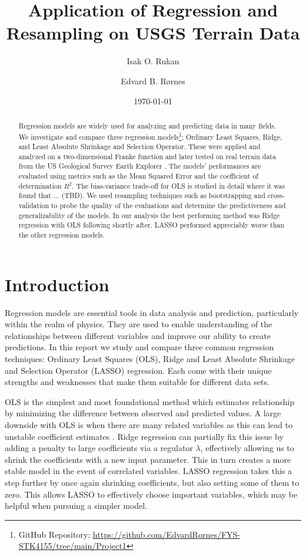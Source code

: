\documentclass[%
reprint,
amsmath,amssymb,
aps,
pra,
]{revtex4-2}
\begin{document}
	
\title{Application of Regression and Resampling on USGS Terrain Data}
\author{Isak O. Rukan}
\author{Edvard B. Rørnes}
\date{\today}

\begin{abstract}
	Regression models are widely used for analyzing and predicting data in many fields. We investigate and compare three regression models\footnote{GitHub Repository: \url{https://github.com/EdvardRornes/FYS-STK4155/tree/main/Project1}}: Ordinary Least Squares, Ridge, and Least Absolute Shrinkage and Selection Operator. These were applied and analyzed on a two-dimensional Franke function and later tested on real terrain data from the US Geological Survey Earth Explorer \cite{USGS_EarthExplorer}. The models' performances are evaluated using metrics such as the Mean Squared Error and the coefficient of determination $R^2$. The bias-variance trade-off for OLS is studied in detail where it was found that ... (TBD). We used resampling techniques such as bootstrapping and cross-validation to probe the quality of the evaluations and determine the predictiveness and generalizability of the models. In our analysis the best performing method was Ridge regression with OLS following shortly after. LASSO performed appreciably worse than the other regression models.
\end{abstract}

\maketitle

\section{Introduction}
Regression models are essential tools in data analysis and prediction, particularly within the realm of physics. They are used to enable understanding of the relationships between different variables and improve our ability to create predictions. In this report we study and compare three common regression techniques: Ordinary Least Squares (OLS), Ridge and Least Absolute Shrinkage and Selection Operator (LASSO) regression. Each come with their unique strengths and weaknesses that make them suitable for different data sets. 

OLS is the simplest and most foundational method which estimates relationship by minimizing the difference between observed and predicted values. A large downside with OLS is when there are many related variables as this can lead to unstable coefficient estimates \cite{Bishop2006}. Ridge regression can partially fix this issue by adding a penalty to large coefficients via a regulator $\lambda$, effectively allowing us to shrink the coefficients with a new input parameter. This in turn creates a more stable model in the event of correlated variables. LASSO regression takes this a step further by once again shrinking coefficients, but also setting some of them to zero. This allows LASSO to effectively choose important variables, which may be helpful when pursuing a simpler model.
\end{document}
